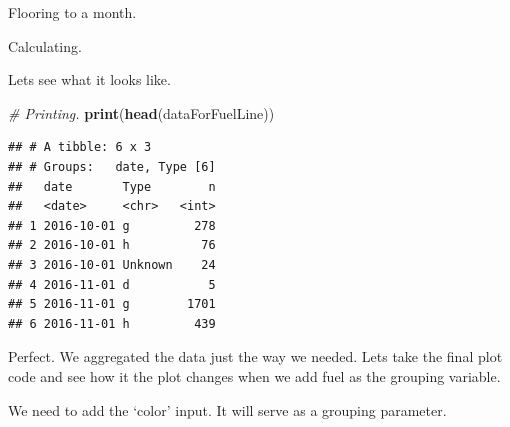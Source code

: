 \documentclass[]{book}
\newenvironment{Shaded}{\begin{snugshade}}{\end{snugshade}}
\newcommand{\CommentTok}[1]{\textcolor[rgb]{0.56,0.35,0.01}{\textit{#1}}}
\newcommand{\KeywordTok}[1]{\textcolor[rgb]{0.13,0.29,0.53}{\textbf{#1}}}
\newcommand{\NormalTok}[1]{#1}
\newcommand{\OperatorTok}[1]{\textcolor[rgb]{0.81,0.36,0.00}{\textbf{#1}}}
\newcommand{\StringTok}[1]{\textcolor[rgb]{0.31,0.60,0.02}{#1}}
\begin{document}
Flooring to a month.

\begin{Shaded}
\end{Shaded}

Calculating.

\begin{Shaded}
\end{Shaded}

Lets see what it looks like.

\begin{Shaded}
\begin{Highlighting}[]
\CommentTok{# Printing.}
\KeywordTok{print}\NormalTok{(}\KeywordTok{head}\NormalTok{(dataForFuelLine))}
\end{Highlighting}
\end{Shaded}

\begin{verbatim}
## # A tibble: 6 x 3
## # Groups:   date, Type [6]
##   date       Type        n
##   <date>     <chr>   <int>
## 1 2016-10-01 g         278
## 2 2016-10-01 h          76
## 3 2016-10-01 Unknown    24
## 4 2016-11-01 d           5
## 5 2016-11-01 g        1701
## 6 2016-11-01 h         439
\end{verbatim}

Perfect. We aggregated the data just the way we needed. Lets take the final plot code and see how it the plot changes when we add fuel as the grouping variable.

We need to add the `color' input. It will serve as a grouping parameter.
\end{document}
